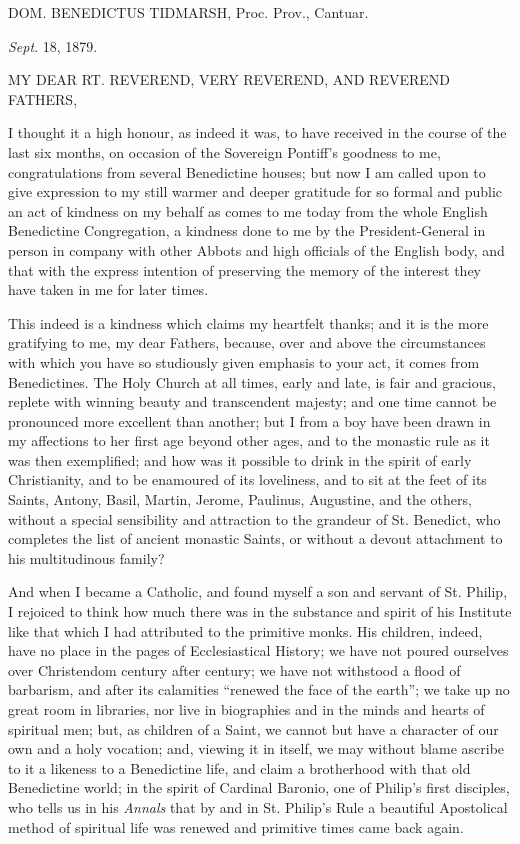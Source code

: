 DOM. BENEDICTUS TIDMARSH,
Proc. Prov., Cantuar.


\emph{Sept}. 18, 1879.

MY DEAR RT.
REVEREND, VERY REVEREND,
AND REVEREND FATHERS,

I thought it a high honour, as indeed it was, to have received in the
course of the last six months, on occasion of the Sovereign Pontiff's
goodness to me, congratulations from several Benedictine houses; but
now I am called upon to give expression to my still warmer and
deeper gratitude for so formal and public an act of kindness on my
behalf as comes to me today from the whole English Benedictine
Congregation, a kindness done to me by the President-General in person
in company with other Abbots and high officials of the English body,
and that with the express intention of preserving the memory of the
interest they have taken in me for later times.

This indeed is a kindness which claims my heartfelt thanks; and it
is the more gratifying to me, my dear Fathers, because, over and above
the circumstances with which you have so studiously given emphasis to
your act, it comes from Benedictines. The Holy Church at all times,
early and late, is fair and gracious, replete with winning beauty and
transcendent majesty; and one time cannot be pronounced more excellent
than another; but I from a boy have been drawn in my affections to her
first age beyond other ages, and to the monastic rule as it was then
exemplified; and how was it possible to drink in the spirit of early
Christianity, and to be enamoured of its loveliness, and to sit at
the feet of its Saints, Antony, Basil, Martin, Jerome, Paulinus,
Augustine, and the others, without a special sensibility and
attraction to the grandeur of St. Benedict, who completes the list of
ancient monastic Saints, or without a devout attachment to his
multitudinous family?

And when I became a Catholic, and found myself a son and servant of
St. Philip, I rejoiced to think how much there was in the substance
and spirit of his Institute like that which I had attributed to the
primitive monks. His children, indeed, have no place in the pages of
Ecclesiastical History; we have not poured ourselves over Christendom
century after century; we have not withstood a flood of barbarism, and
after its calamities ``renewed the face of the earth''; we
take up no great room in libraries, nor live in biographies and in the
minds and hearts of spiritual men; but, as children of a Saint, we
cannot but have a character of our own and a holy vocation; and,
viewing it in itself, we may without blame ascribe to it a likeness to
a Benedictine life, and claim a brotherhood with that old Benedictine
world; in the spirit of Cardinal Baronio, one of Philip's first disciples, who tells us in his \emph{Annals} that by and in St. Philip's
Rule a beautiful Apostolical method of spiritual life was renewed and
primitive times came back again.

